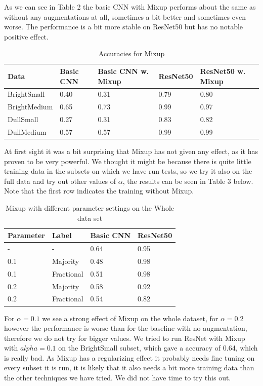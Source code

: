 \documentclass{article}
\begin{document}
As we can see in Table 2 the basic CNN with Mixup performs about the same as without any augmentations at all, sometimes a bit better and sometimes even worse. The performance is a bit more stable on ResNet50 but has no notable positive effect.

\begin{table}[H]
	\caption{Accuracies for Mixup}
	\label{sample-table}
	\centering
	\begin{tabular}{lllll}
		\toprule
		Data &  Basic CNN & Basic CNN w. Mixup & ResNet50 & ResNet50 w. Mixup \\
		\midrule
		BrightSmall  & 0.40 & 0.31 & 0.79 &  0.80 \\
		BrightMedium & 0.65 & 0.73 & 0.99 &  0.97 \\
		DullSmall    & 0.27 & 0.31 & 0.83 &  0.82 \\
		DullMedium   & 0.57 & 0.57 & 0.99 &  0.99 \\
		\bottomrule
	\end{tabular}
\end{table}

At first sight it was a bit surprising that Mixup has not given any effect, as it has proven to be very powerful. We thought it might be because there is quite little training data in the subsets on which we have run tests, so we try it also on the full data and try out other values of $\alpha$, the results can be seen in Table 3 below. Note that the first row indicates the training without Mixup.

\begin{table}[H]
	\caption{Mixup with different parameter settings on the Whole data set}
	\label{sample-table}
	\centering
	\begin{tabular}{llll}
		\toprule
		Parameter & Label & Basic CNN & ResNet50 \\
		\midrule
		-   & -        & 0.64   & 0.95 \\
		0.1 & Majority & 0.48       & 0.98 \\
		0.1 & Fractional & 0.51   & 0.98  \\ 
		0.2 & Majority & 0.58   & 0.92 \\
		0.2 & Fractional & 0.54 & 0.82 \\ 
		
		\bottomrule
	\end{tabular}
\end{table}

For $\alpha=0.1$ we see a strong effect of Mixup on the whole dataset, for $\alpha=0.2$ however the performance is worse than for the baseline with no augmentation, therefore we do not try for bigger values. We tried to run ResNet with Mixup with $alpha=0.1$ on the BrightSmall subset, which gave a accuracy of 0.64, which is really bad. As Mixup has a regularizing effect it probably needs fine tuning on every subset it is run, it is likely that it also needs a bit more training data than the other techniques we have tried. We did not have time to try this out.
\end{document}
